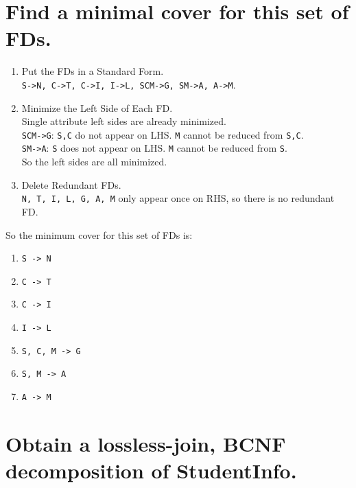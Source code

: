 \documentclass{article}
\begin{document}
\section{Find a minimal cover for this set of FDs.}

\begin{enumerate}
\item Put the FDs in a Standard Form.\\
	\texttt{S->N, C->T, C->I, I->L, SCM->G, SM->A, A->M}.
\item Minimize the Left Side of Each FD.\\
	Single attribute left sides are already minimized.\\
	\texttt{SCM->G}: \texttt{S,C} do not appear on LHS. \texttt{M} cannot be reduced from \texttt{S,C}.\\
	\texttt{SM->A}: \texttt{S} does not appear on LHS. \texttt{M} cannot be reduced from \texttt{S}.\\
	 So the left sides are all minimized.
\item Delete Redundant FDs.\\
	\texttt{N, T, I, L, G, A, M} only appear once on RHS, so there is no redundant FD.
\end{enumerate}
So the minimum cover for this set of FDs is:
	\begin{enumerate}
		\item \texttt{S -> N}
		\item \texttt{C -> T}
		\item \texttt{C -> I}
		\item \texttt{I -> L}
		\item \texttt{S, C, M -> G}
		\item \texttt{S, M -> A}
		\item \texttt{A -> M}
	\end{enumerate}

\section{Obtain a lossless-join, BCNF decomposition of StudentInfo.}
\end{document}
